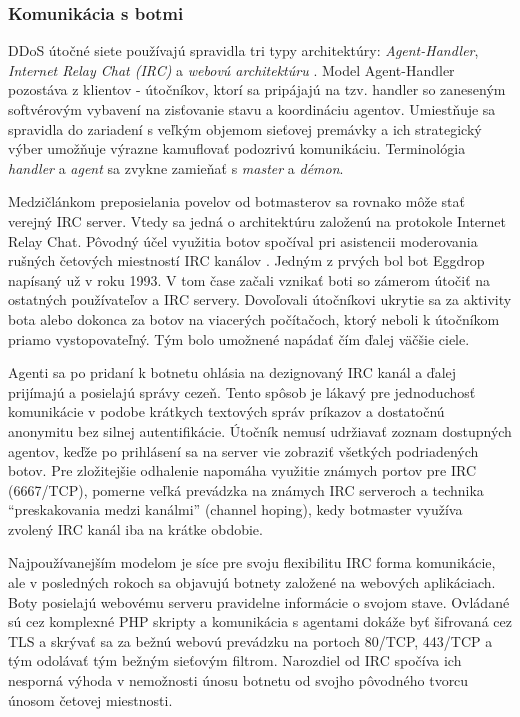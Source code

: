 \documentclass[12pt, a4paper]{article}
\begin{document}
\subsubsection{Komunikácia s botmi}
DDoS útočné siete používajú spravidla tri typy architektúry: \emph{Agent-Handler}, \emph{Internet Relay Chat 
(IRC)} a \emph{webovú architektúru} \cite{ddos-attacks} \cite{botnets}. Model Agent-Handler pozostáva z 
klientov - útočníkov, ktorí sa pripájajú na tzv. handler so zaneseným softvérovým vybavení na zisťovanie 
stavu a koordináciu agentov. Umiestňuje sa spravidla do zariadení s veľkým objemom sieťovej premávky a ich 
strategický výber umožňuje výrazne kamuflovať podozrivú komunikáciu. Terminológia \emph{handler} a 
\emph{agent} sa zvykne zamieňať s \emph{master} a \emph{démon}. 

Medzičlánkom preposielania povelov od botmasterov sa rovnako môže stať verejný IRC server. Vtedy sa jedná o 
architektúru založenú na protokole Internet Relay Chat. Pôvodný účel využitia botov spočíval pri
asistencii moderovania rušných četových miestností IRC kanálov \cite{zombie-roundup}. Jedným z prvých bol 
bot Eggdrop napísaný už v roku 1993. V tom čase začali vznikať boti so zámerom útočiť na ostatných 
používateľov a IRC servery. Dovoľovali útočníkovi ukrytie sa za aktivity bota alebo dokonca za botov na 
viacerých počítačoch, ktorý neboli k útočníkom priamo vystopovateľný. Tým bolo umožnené napádať čím ďalej 
väčšie ciele. 

Agenti sa po pridaní k botnetu ohlásia na dezignovaný IRC kanál a ďalej prijímajú a posielajú správy 
cezeň. Tento spôsob je lákavý pre jednoduchosť komunikácie v podobe krátkych textových správ príkazov a 
dostatočnú anonymitu bez silnej autentifikácie. Útočník nemusí udržiavať zoznam dostupných agentov, keďže po 
prihlásení sa na server vie zobraziť všetkých podriadených botov. Pre zložitejšie odhalenie napomáha 
využitie známych portov pre IRC (6667/TCP), pomerne veľká prevádzka na známych IRC serveroch a technika 
\enquote{preskakovania medzi kanálmi} (channel hoping), kedy botmaster využíva zvolený IRC kanál iba na 
krátke obdobie.

Najpoužívanejším modelom je síce pre svoju flexibilitu IRC forma komunikácie, ale v posledných rokoch sa 
objavujú botnety založené na webových aplikáciach. Boty posielajú webovému serveru pravidelne informácie o 
svojom stave. Ovládané sú cez komplexné PHP skripty a komunikácia s agentami dokáže byť šifrovaná cez TLS a 
skrývať sa za bežnú webovú prevádzku na portoch 80/TCP, 443/TCP a tým odolávať tým bežným sieťovým filtrom. 
Narozdiel od IRC spočíva ich nesporná výhoda v nemožnosti únosu botnetu od svojho pôvodného tvorcu únosom 
četovej miestnosti.
\end{document}
